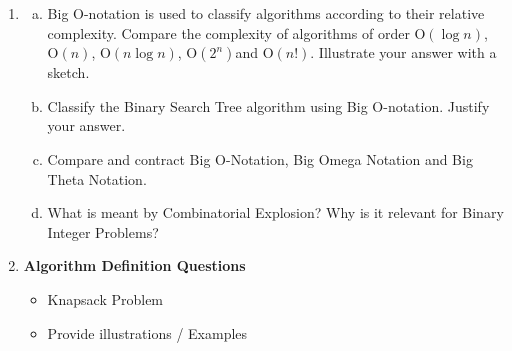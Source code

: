 \documentclass[]{report}
\begin{document}
\begin{enumerate}
 \item
 \begin{enumerate}[(a)]
 	\item Big O-notation is used to classify algorithms according to their relative complexity. Compare the complexity of algorithms of order $\mathrm{O}(\log n)$, $\mathrm{O}(n)$, $\mathrm{O}(n\log n)$, $\mathrm{O}(2^n)$and $\mathrm{O}(n!)$. Illustrate your answer with a sketch. 
 	\item Classify the Binary Search Tree algorithm using Big $\mathrm{O}$-notation. Justify your answer. 
 	\item Compare and contract Big O-Notation, Big Omega Notation and Big Theta Notation. 
 	
 	\item What is meant by Combinatorial Explosion? Why is it relevant for Binary Integer Problems? 
 	
 \end{enumerate}

\item \textbf{Algorithm Definition Questions}
\begin{multicols}{2}
	\begin{itemize}

		\item Knapsack Problem
		\item Provide illustrations / Examples
	\end{itemize}
\end{multicols}
 	



\end{enumerate}
\end{document}
